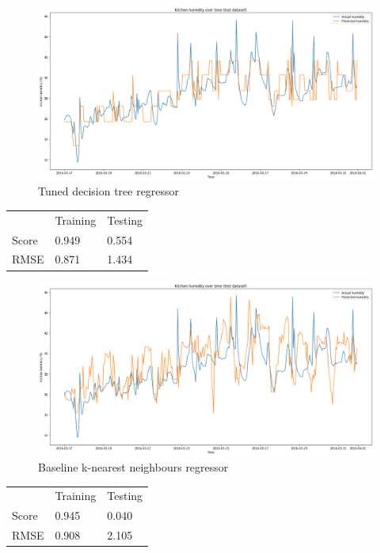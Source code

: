 \documentclass[9.5pt]{beamer}
\begin{document}
    \begin{frame}{}
        \begin{figure}
            \centering
            \includegraphics[width=\linewidth]{images/tuned_tree}
            \caption{Tuned decision tree regressor}
        \end{figure}
        \small
        \begin{table}
            \begin{tabular}{l l l}
                & Training & Testing \\
                Score & 0.949    & 0.554   \\
                RMSE  & 0.871    & 1.434
            \end{tabular}
        \end{table}
    \end{frame}
    \begin{frame}{}
        \begin{figure}
            \centering
            \includegraphics[width=\linewidth]{images/baseline_k}
            \caption{Baseline k-nearest neighbours regressor}
        \end{figure}
        \small
        \begin{table}
            \begin{tabular}{l l l}
                & Training & Testing \\
                Score & 0.945  & 0.040   \\
                RMSE  & 0.908    & 2.105
            \end{tabular}
        \end{table}
    \end{frame}
\end{document}
